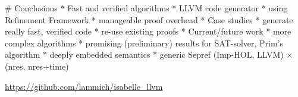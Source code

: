 \documentclass[fleqn]{beamer}
\begin{document}
\renewcommand{\insertsectitle}{}

# Conclusions
  * Fast and verified algorithms
    * LLVM code generator
    * using Refinement Framework
    * manageable proof overhead
  * Case studies
    * generate really fast, verified code
    * re-use existing proofs
  * Current/future work
    * more complex algorithms
      * promising (preliminary) results for SAT-solver, Prim's algorithm
    * deeply embedded semantics
    * generic Sepref (Imp-HOL, LLVM) $\times$ (nres, nres+time)

  \vfill

  \url{https://github.com/lammich/isabelle_llvm}


\end{document}
